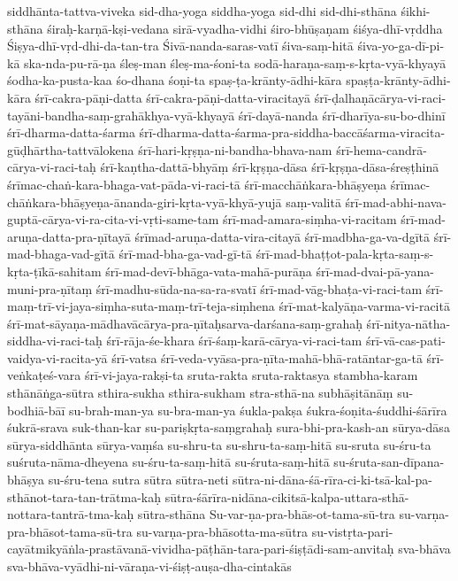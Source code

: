 {siddhānta-tattva-viveka
sid-dha-yoga
siddha-yoga
sid-dhi
sid-dhi-sthāna
śikhi-sthāna
śiraḥ-karṇā-kṣi-vedana
    sirā-vyadha-vidhi
śiro-bhūṣaṇam
śiśya-dhī-vṛddha
Śiṣya-dhī-vṛd-dhi-da-tan-tra
Śivā-nanda-saras-vatī
śiva-saṃ-hitā
śiva-yo-ga-dī-pi-kā
ska-nda-pu-rā-ṇa
śleṣ-man
śleṣ-ma-śoni-ta
sodā-haraṇa-saṃ-s-kṛta-vyā-khyayā
śodha-ka-pusta-kaa
śo-dhana
śoṇi-ta
spaṣ-ṭa-krānty-ādhi-kāra
spaṣṭa-krānty-ādhi-kāra
śrī-cakra-pāṇi-datta
śrī-cakra-pāṇi-datta-viracitayā
śrī-ḍalhaṇācārya-vi-raci-tayāni-bandha-saṃ-grahākhya-vyā-khyayā
śrī-dayā-nanda
    śrī-dharīya-su-bo-dhinī 
    śrī-dharma-datta-śarma 
 śrī-dharma-datta-śarma-pra-siddha-baccāśarma-viracita-gūḍhārtha-tattvālokena
śrī-hari-kṛṣṇa-ni-bandha-bhava-nam
śrī-hema-candrā-cārya-vi-raci-taḥ
śrī-kaṇtha-dattā-bhyāṃ
śrī-kṛṣṇa-dāsa
śrī-kṛṣṇa-dāsa-śreṣṭhinā
śrīmac-chaṅ-kara-bhaga-vat-pāda-vi-raci-tā
    śrī-macchāṅkara-bhāṣyeṇa
 śrīmac-chāṅkara-bhāṣyeṇa-ānanda-giri-kṛta-vyā-khyā-yujā saṃ-valitā 
śrī-mad-abhi-nava-guptā-cārya-vi-ra-cita-vi-vṛti-same-tam
śrī-mad-amara-siṃha-vi-racitam
    śrī-mad-aruṇa-datta-pra-ṇītayā
    śrīmad-aruṇa-datta-vira-citayā
    śrī-madbha-ga-va-dgītā
 śrī-mad-bhaga-vad-gītā 
śrī-mad-bha-ga-vad-gī-tā
śrī-mad-bhaṭṭot-pala-kṛta-saṃ-s-kṛta-ṭīkā-sahitam
śrī-mad-devī-bhāga-vata-mahā-purāṇa
śrī-mad-dvai-pā-yana-muni-pra-ṇītaṃ
    śrī-madhu-sūda-na-sa-ra-svatī 
śrī-mad-vāg-bhaṭa-vi-raci-tam
śrī-maṃ-trī-vi-jaya-siṃha-suta-maṃ-trī-teja-siṃhena
śrī-mat-kalyāṇa-varma-vi-racitā
śrī-mat-sāyaṇa-mādhavācārya-pra-ṇītaḥsarva-darśana-saṃ-grahaḥ
śrī-nitya-nātha-siddha-vi-raci-taḥ
śrī-rāja-śe-khara
śrī-śaṃ-karā-cārya-vi-raci-tam
śrī-vā-cas-pati-vaidya-vi-racita-yā
śrī-vatsa
śrī-veda-vyāsa-pra-ṇīta-mahā-bhā-ratāntar-ga-tā
śrī-veṅkaṭeś-vara
śrī-vi-jaya-rakṣi-ta
sruta-rakta
sruta-raktasya
stambha-karam
sthānāṅga-sūtra
sthira-sukha
sthira-sukham
stra-sthā-na
subhāṣitānāṃ
su-bodhiā-bāī
su-brah-man-ya
su-bra-man-ya
śukla-pakṣa
    śukra-śoṇita-śuddhi-śārīra
śukrā-srava
suk-than-kar
su-pariṣkṛta-saṃgrahaḥ
sura-bhi-pra-kash-an
sūrya-dāsa
sūrya-siddhānta
sūrya-vaṃśa
su-shru-ta
su-shru-ta-saṃ-hitā
su-sruta
su-śru-ta
suśruta-nāma-dheyena
su-śru-ta-saṃ-hitā
su-śruta-saṃ-hitā
su-śruta-san-dīpana-bhāṣya
su-śru-tena
sutra
sūtra
sūtra-neti
sūtra-ni-dāna-śā-rīra-ci-ki-tsā-kal-pa-sthānot-tara-tan-trātma-kaḥ
    sūtra-śārīra-nidāna-cikitsā-kalpa-uttara-sthā-nottara-tantrā-tma-kaḥ 
sūtra-sthāna
Su-var-ṇa-pra-bhās-ot-tama-sū-tra
su-varṇa-pra-bhāsot-tama-sū-tra
su-varṇa-pra-bhāsotta-ma-sūtra
su-vistṛta-pari-cayātmikyāṅla-prastāvanā-vividha-pāṭhān-tara-pari-śiṣṭādi-sam-anvitaḥ
    sva-bhāva
sva-bhāva-vyādhi-ni-vāraṇa-vi-śiṣṭ-auṣa-dha-cintakās
}

